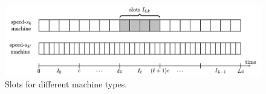   
  \begin{figure}
  \begin{center}
    \includegraphics[width=15cm]{chapters/scheduling2/speed_slots}
     
    \caption{Slots for different machine types.\label{fig:SlotsForMachineClasses}}
  \end{center}
  \end{figure}
  
